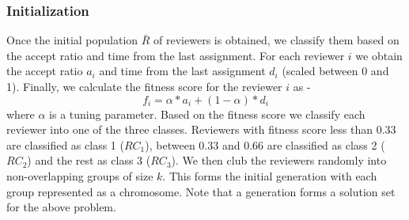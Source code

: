 \subsubsection{Initialization} Once the initial population $\bar R$ of reviewers is obtained, we classify them based on 
the accept ratio and time from the last assignment. For each reviewer $i$ we obtain the accept ratio $a_{i}$ and time from the last 
assignment $d_i$ (scaled between 0 and 1). Finally, we calculate the fitness score for the reviewer $i$ as -
\begin{equation}
 f_i = \alpha \ast a_i + (1-\alpha)\ast d_i
\end{equation}
where $\alpha$ is a tuning parameter. Based on the fitness score we classify each reviewer into one of the three classes. Reviewers with fitness score 
less than $0.33$ are classified as class 1 ($RC_1$), between $0.33$ and $0.66$ are classified as class 2 ($RC_2$) and the rest as class 3 ($RC_3$). 
We then club the reviewers randomly into non-overlapping groups of size $k$. This forms the initial generation with each group represented as 
a chromosome. Note that a generation forms a solution set for the above problem.

